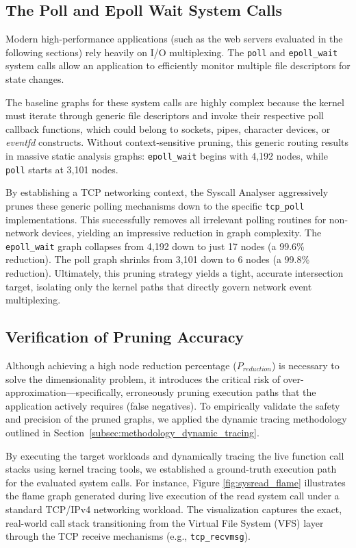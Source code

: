\subsection{The Poll and Epoll Wait System Calls}

Modern high-performance applications (such as the web servers evaluated in the following sections) rely heavily on I/O multiplexing.
The \texttt{poll} and \texttt{epoll\_wait} system calls allow an application to efficiently monitor multiple file descriptors for state changes.

The baseline graphs for these system calls are highly complex because the kernel must iterate through generic file descriptors and invoke their respective poll callback functions, which could belong to sockets, pipes, character devices, or \textit{eventfd} constructs.
Without context-sensitive pruning, this generic routing results in massive static analysis graphs: \texttt{epoll\_wait} begins with 4,192 nodes, while \texttt{poll} starts at 3,101 nodes.

By establishing a TCP networking context, the Syscall Analyser aggressively prunes these generic polling mechanisms down to the specific \texttt{tcp\_poll} implementations.
This successfully removes all irrelevant polling routines for non-network devices, yielding an impressive reduction in graph complexity.
The \texttt{epoll\_wait} graph collapses from 4,192 down to just 17 nodes (a 99.6\% reduction).
The poll graph shrinks from 3,101 down to 6 nodes (a 99.8\% reduction).
Ultimately, this pruning strategy yields a tight, accurate intersection target, isolating only the kernel paths that directly govern network event multiplexing.

\subsection{Verification of Pruning Accuracy}

Although achieving a high node reduction percentage ($P_{reduction}$) is necessary to solve the dimensionality problem, it introduces the critical risk of over-approximation—specifically, erroneously pruning execution paths that the application actively requires (false negatives).
To empirically validate the safety and precision of the pruned graphs, we applied the dynamic tracing methodology outlined in Section~\ref{subsec:methodology_dynamic_tracing}.

By executing the target workloads and dynamically tracing the live function call stacks using kernel tracing tools, we established a ground-truth execution path for the evaluated system calls.
For instance, Figure \ref{fig:sysread_flame} illustrates the flame graph generated during live execution of the read system call under a standard TCP/IPv4 networking workload.
The visualization captures the exact, real-world call stack transitioning from the Virtual File System (VFS) layer through the TCP receive mechanisms (e.g., \texttt{tcp\_recvmsg}).

